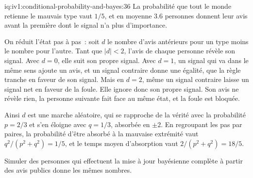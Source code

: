 \begin{solution}{iq:iv1:conditional-probability-and-bayes:36}
La probabilité que tout le monde retienne le mauvais type vaut $1/5$, et en moyenne $3.6$ personnes donnent leur avis avant la première dont le signal n'a plus d'importance.

On réduit l'état pas à pas~: soit $d$ le nombre d'avis antérieurs pour un type moins le nombre pour l'autre. Tant que $|d| < 2$, l'avis de chaque personne révèle son signal. Avec $d = 0$, elle suit son propre signal. Avec $d = 1$, un signal qui va dans le même sens ajoute un avis, et un signal contraire donne une égalité, que la règle tranche en faveur de son signal. Mais en $d = 2$, même un signal contraire laisse un signal net en faveur de la foule. Elle ignore donc son propre signal. Son avis ne révèle rien, la personne suivante fait face au même état, et la foule est bloquée.

Ainsi $d$ est une marche aléatoire, qui se rapproche de la vérité avec la probabilité $p = 2/3$ et s'en éloigne avec $q = 1/3$, absorbée en $\pm 2$. En regroupant les pas par paires, la probabilité d'être absorbé à la mauvaise extrémité vaut $q^2/(p^2 + q^2) = 1/5$, et le temps moyen d'absorption vaut $2/(p^2 + q^2) = 18/5$.

Simuler des personnes qui effectuent la mise à jour bayésienne complète à partir des avis publics donne les mêmes nombres.

\end{solution}


